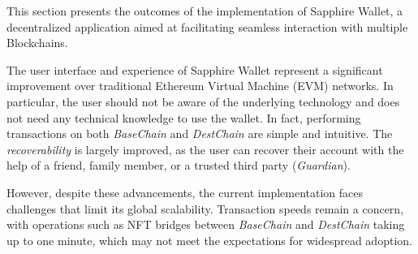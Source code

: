 





This section presents the outcomes of the implementation of Sapphire Wallet, a decentralized application aimed at facilitating seamless interaction with multiple Blockchains.

The user interface and experience of Sapphire Wallet represent a significant improvement over traditional Ethereum Virtual Machine (EVM) networks. In particular, the user should not be aware of the underlying technology and does not need any technical knowledge to use the wallet. In fact, performing transactions on both \textit{BaseChain} and \textit{DestChain} are simple and intuitive. The \textit{recoverability} is largely improved, as the user can recover their account with the help of a friend, family member, or a trusted third party (\textit{Guardian}). 

However, despite these advancements, the current implementation faces challenges that limit its global scalability. Transaction speeds remain a concern, with operations such as NFT bridges between \textit{BaseChain} and \textit{DestChain} taking up to one minute, which may not meet the expectations for widespread adoption.

